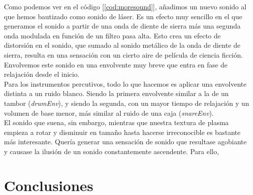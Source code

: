 Como podemos ver en el código [\ref{cod:moresound}], añadimos un nuevo sonido al que hemos bautizado como sonido de láser. Es un efecto muy sencillo en el que generamos el sonido a partir de una onda de diente de sierra más una segunda onda modulada en función de un filtro pasa alta. Esto crea un efecto de distorsión en el sonido, que sumado al sonido metálico de la onda de diente de sierra, resulta en una sensación con un cierto aire de película de ciencia ficción. Envolvemos este sonido en una envolvente muy breve que entra en fase de relajación desde el inicio.\\

Para los instrumentos percutivos, todo lo que hacemos es aplicar una envolvente distinta a un ruido blanco. Siendo la primera envolvente similar a la de un tambor (\emph{drumEnv}), y siendo la segunda, con un mayor tiempo de relajación y un volumen de base menor, más similar al ruido de una caja (\emph{snareEnv}).\\

El sonido que suena, sin embargo, mientras que nuestra textura de plasma empieza a rotar y disminuir en tamaño hasta hacerse irreconocible es bastante más interesante. Quería generar una sensación de sonido que resultase agobiante y causase la ilusión de un sonido constantemente ascendente. Para ello, 

\section{Conclusiones}
